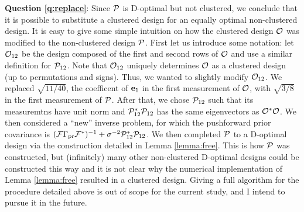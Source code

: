 \textbf{Question \ref{q:replace}}: Since $\mathcal{P}$ is D-optimal but not
clustered, we conclude that it is possible to substitute a clustered
design for an equally optimal non-clustered design. It is easy to give
some simple intuition on how the clustered design $\mathcal{O}$ was modified
to the non-clustered design $\mathcal{P}$. First let us introduce some
notation: let $\mathcal{O}_{12}$ be the design composed of the first and
second rows of $\mathcal{O}$ and use a similar definition for
$\mathcal{P}_{12}$. Note that $\mathcal{O}_{12}$ uniquely determines $\mathcal{O}$ as a
clustered design (up to permutations and signs). Thus, we wanted to
slightly modify $\mathcal{O}_{12}$. We replaced $\sqrt{11/40}$, the
coefficent of $\mathbf{e}_1$ in the first measurement of $\mathcal{O}$, with
$\sqrt{3/8}$ in the first measurement of $\mathcal{P}$. After that, we chose
$\mathcal{P}_{12}$ such that its measuremtns have unit norm and
$\mathcal{P}_{12}^* \mathcal{P}_{12}$ has the same eigenvectors as
$\mathcal{O}^*\mathcal{O}$. We then considered a ``new'' inverse problem, for which
the pushforward prior covariance is $(\mathcal{F} \Gamma_{\textup{pr}}\mathcal{F}^*)^{-1} +
\sigma^{-2} \mathcal{P}_{12}^*\mathcal{P}_{12}$. We then completed $\mathcal{P}$ to a
D-optimal design via the construction detailed in Lemma
\ref{lemma:free}. This is how $\mathcal{P}$ was constructed, but
(infinitely) many other non-clustered D-optimal designs could be
constructed this way and it is not clear why the numerical
implementation of Lemma \ref{lemma:free} resulted in a clustered
design. Giving a full algorithm for the procedure detailed above is
out of scope for the current study, and I intend to pursue it in the
future.


\clusterization


\noclusterization


